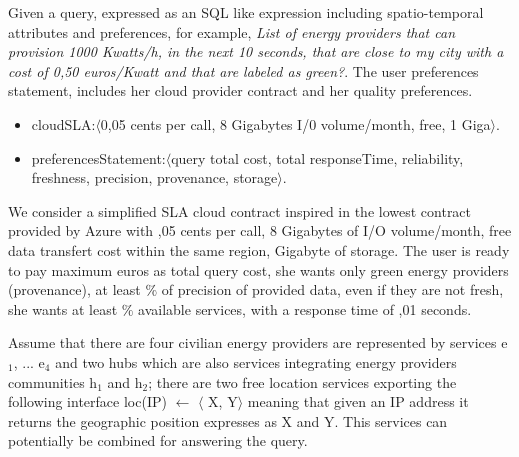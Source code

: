  Given a query, expressed as an SQL like expression including spatio-temporal attributes and preferences, for example, {\em List of energy providers that can provision 1000 Kwatts/h, in the next 10 seconds, that are close to my city with a cost of 0,50 euros/Kwatt and that are labeled as green?}. The user preferences statement, includes her cloud provider contract and her quality preferences. 
 \begin{itemize}
\sf\footnotesize
 
 \item  {\sf cloudSLA:$\langle$0,05 cents per call, 8 Gigabytes I/0 volume/month, free, 1 Giga$\rangle$}. 
 
 \item {\sf preferencesStatement:$\langle$query total cost,  total responseTime, reliability, freshness, precision, provenance, storage$\rangle$}. 
 
 \end{itemize}
 We consider a simplified SLA cloud contract inspired in the lowest contract provided by Azure with {,05 cents per call,  8 Gigabytes of I/O volume/month, free data transfert cost within the same region,  Gigabyte of storage}. The user is ready to pay maximum { euros as total query cost}, she wants only {\sf green} energy providers (provenance), at least {$\%$} of precision of provided data, even if they are not fresh, she wants at least {$\%$} available services, with a response time of {,01 seconds}.
 
 Assume that there are four civilian energy providers are represented by services  {\sf e$_1$, ... e$_4$} and two {\sf hub}s which are also services integrating energy providers communities {\sf h$_1$ and h$_2$}; there are two free location services exporting  the following interface {\sf loc(IP) $\leftarrow$ $\langle$ X, Y$\rangle$} meaning that given an IP address it returns the geographic position expresses as {\sf X} and {\sf Y}. This services can potentially be combined for answering the query. 
 
